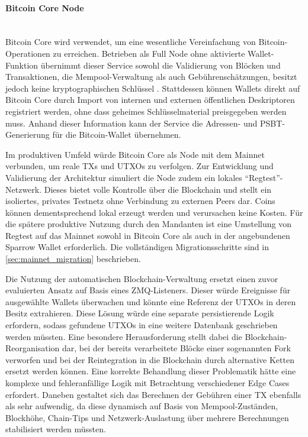 \paragraph{Bitcoin Core Node} \mbox{}\\
Bitcoin Core wird verwendet, um eine wesentliche Vereinfachung von Bitcoin-Operationen zu erreichen. Betrieben als Full Node ohne aktivierte Wallet-Funktion übernimmt dieser Service sowohl die Validierung von Blöcken und Transaktionen, die Mempool-Verwaltung als auch Gebührenschätzungen, besitzt jedoch keine kryptographischen Schlüssel \cite{bitcoin_core_docs,Sparrow_Wallets_Node_Connect}.
Stattdessen können Wallets direkt auf Bitcoin Core durch Import von internen und externen öffentlichen Deskriptoren registriert werden, ohne dass geheimes Schlüsselmaterial preisgegeben werden muss. Anhand dieser Information kann der Service die Adressen- und \ac{PSBT}-Generierung für die Bitcoin-Wallet übernehmen.

Im produktiven Umfeld würde Bitcoin Core als Node mit dem Mainnet verbunden, um reale \acp{TX} und \acp{UTXO} zu verfolgen. Zur Entwicklung und Validierung der Architektur simuliert die Node zudem ein lokales \enquote{Regtest}-Netzwerk. Dieses bietet volle Kontrolle über die Blockchain und stellt ein isoliertes, privates Testnetz ohne Verbindung zu externen Peers dar. Coins können dementsprechend lokal erzeugt werden und verursachen keine Kosten.
Für die spätere produktive Nutzung durch den Mandanten ist eine Umstellung von Regtest auf das Mainnet sowohl in Bitcoin Core als auch in der angebundenen Sparrow Wallet erforderlich. Die vollständigen Migrationsschritte sind in \ref{sec:mainnet_migration} beschrieben.

Die Nutzung der automatischen Blockchain-Verwaltung ersetzt einen zuvor evaluierten Ansatz auf Basis eines \ac{ZMQ}-Listeners. Dieser würde Ereignisse für ausgewählte Wallets überwachen und könnte eine Referenz der \acp{UTXO} in deren Besitz extrahieren. Diese Lösung würde eine separate persistierende Logik erfordern, sodass gefundene \acp{UTXO} in eine weitere Datenbank geschrieben werden müssten. Eine besondere Herausforderung stellt dabei die Blockchain-Reorganisation dar, bei der bereits verarbeitete Blöcke einer sogenannten Fork verworfen und bei der Reintegration in die Blockchain durch alternative Ketten ersetzt werden können. Eine korrekte Behandlung dieser Problematik hätte eine komplexe und fehleranfällige Logik mit Betrachtung verschiedener Edge Cases erfordert. Daneben gestaltet sich das Berechnen der Gebühren einer \ac{TX} ebenfalls als sehr aufwendig, da diese dynamisch auf Basis von Mempool-Zuständen, Blockhöhe, Chain-Tips und Netzwerk-Auslastung über mehrere Berechnungen stabilisiert werden müssten.

